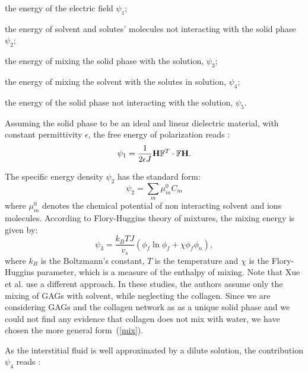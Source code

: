 \begin{enumerate}
	{\indentitem\item[\textbullet] the energy of the electric field $\psi_1$;}
	{\indentitem \item[\textbullet] the energy of solvent and solutes' molecules not interacting with the solid phase $\psi_2$;}
	{\indentitem\item[\textbullet] the energy of mixing the solid phase with the solution, $\psi_3$;}
	{\indentitem\item[\textbullet] the energy of mixing the solvent with the solutes in solution, $\psi_4$;}
	{\indentitem\item[\textbullet] the energy of the solid phase not interacting with the solution, $\psi_5$.}
\end{enumerate}

Assuming the solid phase to be an ideal and linear dielectric material, with constant permittivity $\epsilon$, the free energy of polarization reads \cite{DROZDOV+,Reviewpolyel}:
\begin{gather}
\psi_1 = \frac{1}{2\epsilon J} \mathbf{H}\mathbb{F}^T \cdot \mathbb{F} \mathbf{H}.
\end{gather}

The specific energy density $\psi_2$ has the standard form:
\begin{equation}
\psi_2 = \sum\limits_{m} \mu^0_m C_m
\end{equation} 
where $\mu^0_m$ denotes the chemical potential of non interacting solvent and ions molecules. According to Flory-Huggins theory \cite{flory,hug} of mixtures, the mixing energy is given by:
\begin{equation}
\psi_3 = \frac{k_B T J}{v_s} \left(\phi_f \ln \phi_f + \chi \phi_f \phi_n\right),\label{mix}
\end{equation}
where $k_B$ is the Boltzmann's constant, $T$ is the temperature and $\chi$ is the Flory-Huggins parameter, which is a measure of the enthalpy of mixing. Note that Xue et al.\cite{ecm1,ecm2} use a different approach. In these studies, the authors assume only the mixing of GAGs with solvent, while neglecting the collagen. Since we are considering GAGs and the collagen network as as a unique solid phase and we could not find any evidence that collagen does not mix with water, we have chosen the more general form~(\ref{mix}).

As the interstitial fluid is well approximated by a dilute solution, the contribution $\psi_4$ reads \cite{Reviewpolyel,ecm1,ecm2}:

